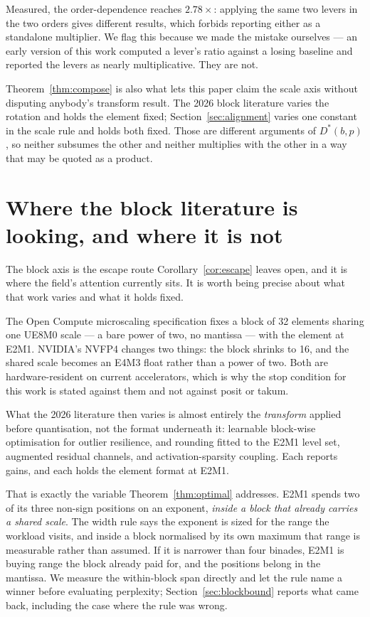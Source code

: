 \documentclass[11pt]{article}
\theoremstyle{definition}
\begin{document}
Measured, the order-dependence reaches $2.78\times$: applying the same two levers
in the two orders gives different results, which forbids reporting either as a
standalone multiplier. We flag this because we made the mistake ourselves ---
an early version of this work computed a lever's ratio against a losing baseline
and reported the levers as nearly multiplicative. They are not.

Theorem~\ref{thm:compose} is also what lets this paper claim the scale axis
without disputing anybody's transform result. The 2026 block literature varies
the rotation and holds the element fixed; Section~\ref{sec:alignment} varies one
constant in the scale rule and holds both fixed. Those are different arguments of
$D^{*}(b,p)$, so neither subsumes the other and neither multiplies with the other
in a way that may be quoted as a product.

\section{Where the block literature is looking, and where it is not}
\label{sec:blockrelated}

The block axis is the escape route Corollary~\ref{cor:escape} leaves open, and it
is where the field's attention currently sits. It is worth being precise about
what that work varies and what it holds fixed.

The Open Compute microscaling specification fixes a block of 32 elements sharing
one UE8M0 scale --- a bare power of two, no mantissa --- with the element at E2M1.
NVIDIA's NVFP4 changes two things: the block shrinks to 16, and the shared scale
becomes an E4M3 float rather than a power of two. Both are hardware-resident on
current accelerators, which is why the stop condition for this work is stated
against them and not against posit or takum.

What the 2026 literature then varies is almost entirely the \emph{transform}
applied before quantisation, not the format underneath it: learnable block-wise
optimisation for outlier resilience, and rounding fitted to the E2M1
level set, augmented residual channels, and activation-sparsity coupling. Each
reports gains, and each holds the element format at E2M1.

That is exactly the variable Theorem~\ref{thm:optimal} addresses. E2M1 spends two
of its three non-sign positions on an exponent, \emph{inside a block that already
carries a shared scale}. The width rule says the exponent is sized for the range
the workload visits, and inside a block normalised by its own maximum that range
is measurable rather than assumed. If it is narrower than four binades, E2M1 is
buying range the block already paid for, and the positions belong in the mantissa.
We measure the within-block span directly and let the rule name a winner before
evaluating perplexity; Section~\ref{sec:blockbound} reports what came back,
including the case where the rule was wrong.
\end{document}
